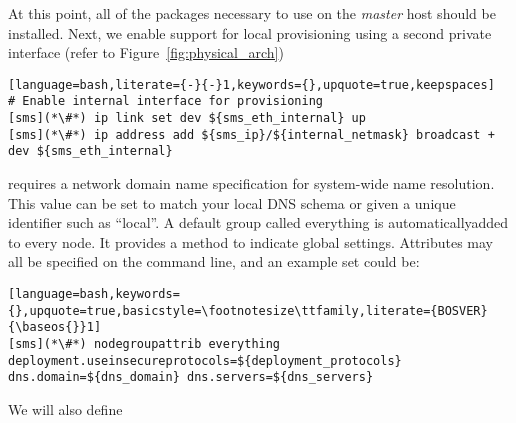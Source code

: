 At this point, all of the packages necessary to use \Confluent{} on the {\em master}
host should be installed. Next, we enable support for local provisioning using
a second private interface (refer to Figure~\ref{fig:physical_arch})

\begin{lstlisting}[language=bash,literate={-}{-}1,keywords={},upquote=true,keepspaces]
# Enable internal interface for provisioning
[sms](*\#*) ip link set dev ${sms_eth_internal} up
[sms](*\#*) ip address add ${sms_ip}/${internal_netmask} broadcast + dev ${sms_eth_internal}

\end{lstlisting}


\noindent \Confluent{} requires a network domain name specification for system-wide name
resolution. This value can be set to match your local DNS schema or given a
unique identifier such as ``local''. A default group called everything is 
automaticallyadded to every node. It provides a method to indicate global settings.
Attributes may all be specified on the command line, and an example set could be:

\begin{lstlisting}[language=bash,keywords={},upquote=true,basicstyle=\footnotesize\ttfamily,literate={BOSVER}{\baseos{}}1]
[sms](*\#*) nodegroupattrib everything deployment.useinsecureprotocols=${deployment_protocols} dns.domain=${dns_domain} dns.servers=${dns_servers}
\end{lstlisting}

\noindent We will also define 